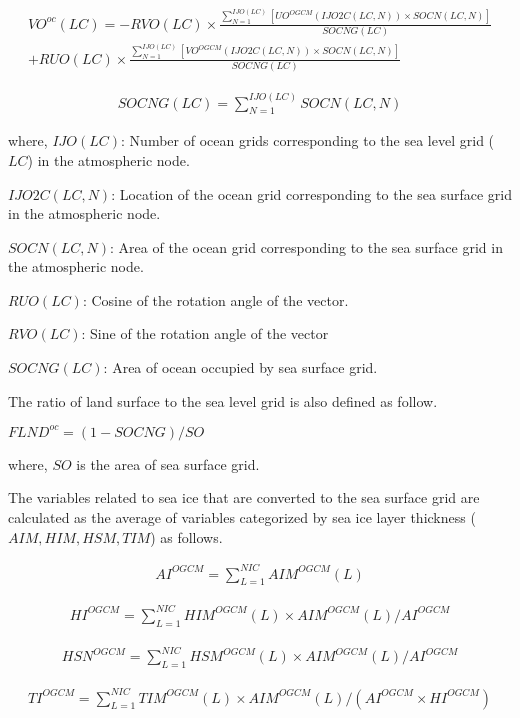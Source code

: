 \begin{eqnarray} VO^{oc}(LC)=-RVO(LC) \times  \frac{\sum_{N=1}^{IJO(LC)}[UO^{OGCM}(IJO2C(LC,N)) \times SOCN(LC,N)]}{SOCNG(LC)} \\ + RUO(LC) \times  \frac{\sum_{N=1}^{IJO(LC)}[VO^{OGCM}(IJO2C(LC,N)) \times SOCN(LC,N)]}{SOCNG(LC)} \end{eqnarray}

\begin{eqnarray} SOCNG(LC)= \sum_{N=1}^{IJO(LC)}SOCN(LC,N) \end{eqnarray}

where, \(IJO(LC)\): Number of ocean grids corresponding to the sea level
grid (\(LC\)) in the atmospheric node.

\(IJO2C(LC,N)\): Location of the ocean grid corresponding to the sea
surface grid in the atmospheric node.

\(SOCN(LC,N)\): Area of the ocean grid corresponding to the sea surface
grid in the atmospheric node.

\(RUO(LC)\): Cosine of the rotation angle of the vector.

\(RVO(LC)\): Sine of the rotation angle of the vector

\(SOCNG(LC)\): Area of ocean occupied by sea surface grid.

The ratio of land surface to the sea level grid is also defined as
follow.

\(FLND^{oc}=(1-SOCNG)/SO\)

where, \(SO\) is the area of sea surface grid.

The variables related to sea ice that are converted to the sea surface
grid are calculated as the average of variables categorized by sea ice
layer thickness (\(AIM,HIM,HSM,TIM\)) as follows.

\begin{eqnarray} AI^{OGCM} = \sum_{L=1}^{NIC} AIM^{OGCM}(L) \end{eqnarray}

\begin{eqnarray} HI^{OGCM} = \sum_{L=1}^{NIC} HIM^{OGCM}(L) \times AIM^{OGCM}(L)/AI^{OGCM} \end{eqnarray}

\begin{eqnarray} HSN^{OGCM} = \sum_{L=1}^{NIC} HSM^{OGCM}(L) \times AIM^{OGCM}(L)/AI^{OGCM} \end{eqnarray}

\begin{eqnarray} TI^{OGCM} = \sum_{L=1}^{NIC} TIM^{OGCM}(L) \times AIM^{OGCM}(L)/(AI^{OGCM} \times HI^{OGCM}) \end{eqnarray}

